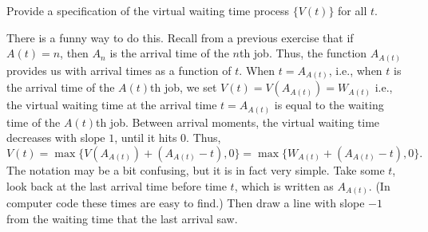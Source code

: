 \begin{question}
  Provide a specification of the virtual waiting time process $\{V(t)\}$ for
    all $t$.
    \begin{solution}
      There is a funny way to do this. Recall from a previous exercise
      that if $A(t)=n$, then $A_n$ is the arrival time of the $n$th
      job. Thus, the function $A_{A(t)}$ provides us with arrival
      times as a function of $t$. When $t=A_{A(t)}$, i.e., when $t$ is
      the arrival time of the $A(t)$th job, we set
      $V(t) = V(A_{A(t)}) = W_{A(t)}$ i.e., the virtual waiting time
      at the arrival time $t=A_{A(t)}$ is equal to the waiting time of
      the $A(t)$th job. Between arrival moments, the virtual waiting
      time decreases with slope $1$, until it hits 0.  Thus,
      \begin{equation*}
        V(t) 
= \max\{V(A_{A(t)}) + (A_{A(t)}-t), 0\} 
= \max\{W_{A(t)} + (A_{A(t)}-t), 0\}.
      \end{equation*}
      The notation may be a bit confusing, but it is in fact very
      simple. Take some $t$, look back at the last arrival time before
      time $t$, which is written as $A_{A(t)}$. (In computer code these
      times are easy to find.) Then draw a line with slope $-1$ from
      the waiting time that the last arrival saw.
    \end{solution}
\end{question}




